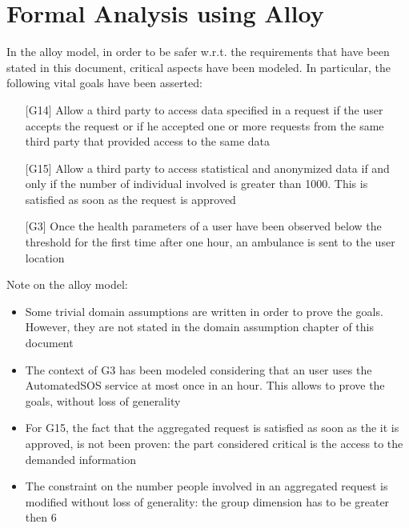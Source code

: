 \section{Formal Analysis using Alloy}
In the alloy model, in order to be safer w.r.t. the requirements that have been stated in this document, critical aspects have been modeled. 
In particular, the following vital goals have been asserted:
\begin{enumerate}
\item[{[G14]}]  Allow a third party to access data specified in a request if the user accepts the request or if he accepted one or more requests from the same third party that provided access to the same data 
\item[{[G15]}] Allow a third party to access statistical and anonymized data if and only if the number of individual involved is greater than 1000. This is satisfied as soon as the request is approved  
\item[{[G3]}] Once the health parameters of a user have been observed below the threshold for the first time after one hour, an ambulance is sent to the user location
\end{enumerate}

Note on the alloy model: 
\begin{itemize}
\item Some trivial domain assumptions are written in order to prove the goals. However, they are 
not stated in the domain assumption chapter of this document 
\item The context of G3 has been modeled considering that an user uses the AutomatedSOS service at most once in an hour. This allows to prove the goals, without loss of generality 
\item For G15, the fact that the aggregated request is satisfied as soon as the it is approved, is not been proven: the part considered critical is the access to the demanded information 
\item The constraint on the number people involved in an aggregated request is modified without loss of generality: the group dimension has to be greater then 6 
\end{itemize}



